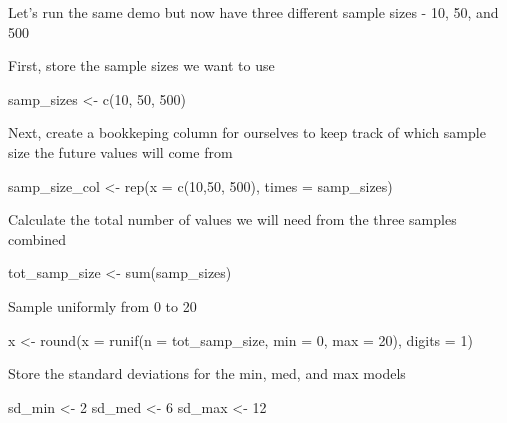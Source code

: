 \documentclass[
]{book}
\newenvironment{Shaded}{\begin{snugshade}}{\end{snugshade}}
\newcommand{\AttributeTok}[1]{\textcolor[rgb]{0.77,0.63,0.00}{#1}}
\newcommand{\DecValTok}[1]{\textcolor[rgb]{0.00,0.00,0.81}{#1}}
\newcommand{\FunctionTok}[1]{\textcolor[rgb]{0.00,0.00,0.00}{#1}}
\newcommand{\NormalTok}[1]{#1}
\newcommand{\OtherTok}[1]{\textcolor[rgb]{0.56,0.35,0.01}{#1}}
\begin{document}
Let's run the same demo but now have three different sample sizes - 10, 50, and 500

First, store the sample sizes we want to use

\begin{Shaded}
\begin{Highlighting}[]
\NormalTok{samp\_sizes }\OtherTok{\textless{}{-}} \FunctionTok{c}\NormalTok{(}\DecValTok{10}\NormalTok{, }\DecValTok{50}\NormalTok{, }\DecValTok{500}\NormalTok{)}
\end{Highlighting}
\end{Shaded}

Next, create a bookkeping column for ourselves to keep track of which sample size the future values will come from

\begin{Shaded}
\begin{Highlighting}[]
\NormalTok{samp\_size\_col }\OtherTok{\textless{}{-}} \FunctionTok{rep}\NormalTok{(}\AttributeTok{x =} \FunctionTok{c}\NormalTok{(}\DecValTok{10}\NormalTok{,}\DecValTok{50}\NormalTok{, }\DecValTok{500}\NormalTok{), }\AttributeTok{times =}\NormalTok{ samp\_sizes)}
\end{Highlighting}
\end{Shaded}

Calculate the total number of values we will need from the three samples combined

\begin{Shaded}
\begin{Highlighting}[]
\NormalTok{tot\_samp\_size }\OtherTok{\textless{}{-}} \FunctionTok{sum}\NormalTok{(samp\_sizes)}
\end{Highlighting}
\end{Shaded}

Sample uniformly from 0 to 20

\begin{Shaded}
\begin{Highlighting}[]
\NormalTok{x }\OtherTok{\textless{}{-}} \FunctionTok{round}\NormalTok{(}\AttributeTok{x =} \FunctionTok{runif}\NormalTok{(}\AttributeTok{n =}\NormalTok{ tot\_samp\_size, }\AttributeTok{min =} \DecValTok{0}\NormalTok{, }\AttributeTok{max =} \DecValTok{20}\NormalTok{), }\AttributeTok{digits =} \DecValTok{1}\NormalTok{)}
\end{Highlighting}
\end{Shaded}

Store the standard deviations for the min, med, and max models

\begin{Shaded}
\begin{Highlighting}[]
\NormalTok{sd\_min }\OtherTok{\textless{}{-}} \DecValTok{2}
\NormalTok{sd\_med }\OtherTok{\textless{}{-}} \DecValTok{6}
\NormalTok{sd\_max }\OtherTok{\textless{}{-}} \DecValTok{12}
\end{Highlighting}
\end{Shaded}
\end{document}
